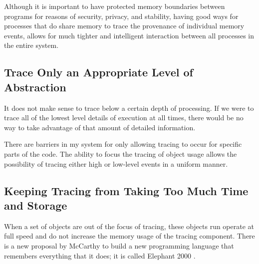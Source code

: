 Although it is important to have protected memory boundaries between
programs for reasons of security, privacy, and stability, having good
ways for processes that do share memory to trace the provenance of
individual memory events, allows for much tighter and intelligent
interaction between all processes in the entire system.
        

\subsection{Trace Only an Appropriate Level of Abstraction}

It does not make sense to trace below a certain depth of processing.
If we were to trace all of the lowest level details of execution at
all times, there would be no way to take advantage of that amount
of detailed information.

There are barriers in my system for only allowing tracing to occur for
specific parts of the code.  The ability to focus the tracing of object
usage allows the possibility of tracing either high or low-level events
in a uniform manner.

\subsection{Keeping Tracing from Taking Too Much Time and Storage}

When a set of objects are out of the focus of tracing, these objects run
operate at full speed and do not increase the memory usage of the
tracing component.  There is a new proposal by McCarthy to build a new
programming language that remembers everything that it does; it is
called Elephant 2000 \citep{mccarthy:1994}.

